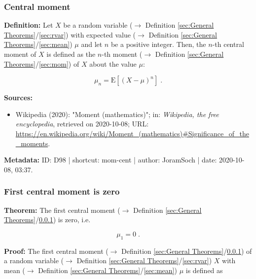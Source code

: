 \documentclass[a4paper,12pt,twoside]{book}
\begin{document}
\subsubsection[\textit{Central moment}]{Central moment} \label{sec:mom-cent}
\setcounter{equation}{0}

\textbf{Definition:} Let $X$ be a random variable ($\rightarrow$ Definition \ref{sec:General Theorems}/\ref{sec:rvar}) with expected value ($\rightarrow$ Definition \ref{sec:General Theorems}/\ref{sec:mean}) $\mu$ and let $n$ be a positive integer. Then, the $n$-th central moment of $X$ is defined as the $n$-th moment ($\rightarrow$ Definition \ref{sec:General Theorems}/\ref{sec:mom}) of $X$ about the value $\mu$:

\begin{equation} \label{eq:mom-cent-mom-cent}
\mu_n = \mathrm{E}[(X-\mu)^n] \; .
\end{equation}


\vspace{1em}
\textbf{Sources:}
\begin{itemize}
\item Wikipedia (2020): "Moment (mathematics)"; in: \textit{Wikipedia, the free encyclopedia}, retrieved on 2020-10-08; URL: \url{https://en.wikipedia.org/wiki/Moment_(mathematics)#Significance_of_the_moments}.
\end{itemize}


\vspace{1em}
\textbf{Metadata:} ID: D98 | shortcut: mom-cent | author: JoramSoch | date: 2020-10-08, 03:37.
\vspace{1em}



\subsubsection[\textbf{First central moment is zero}]{First central moment is zero} \label{sec:momcent-1st}
\setcounter{equation}{0}

\textbf{Theorem:} The first central moment ($\rightarrow$ Definition \ref{sec:General Theorems}/\ref{sec:mom-cent}) is zero, i.e.

\begin{equation} \label{eq:momcent-1st-momcent-1st}
\mu_1 = 0 \; .
\end{equation}


\vspace{1em}
\textbf{Proof:} The first central moment ($\rightarrow$ Definition \ref{sec:General Theorems}/\ref{sec:mom-cent}) of a random variable ($\rightarrow$ Definition \ref{sec:General Theorems}/\ref{sec:rvar}) $X$ with mean ($\rightarrow$ Definition \ref{sec:General Theorems}/\ref{sec:mean}) $\mu$ is defined as
\end{document}
